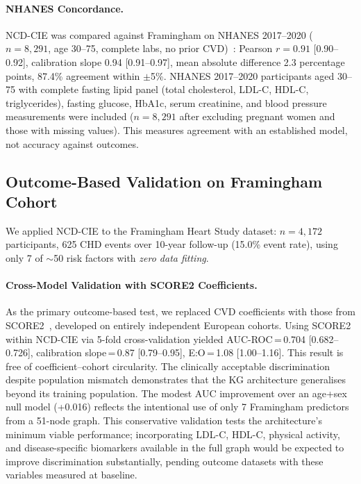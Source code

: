 \documentclass[runningheads]{llncs}
\begin{document}
\paragraph{NHANES Concordance.}
NCD-CIE was compared against Framingham on NHANES 2017--2020
($n = 8{,}291$, age 30--75, complete labs, no prior
CVD)~\cite{nhanes2020}: Pearson $r = 0.91$ [0.90--0.92],
calibration slope 0.94 [0.91--0.97], mean absolute difference
2.3 percentage points, 87.4\% agreement within $\pm$5\%.
NHANES 2017--2020 participants aged 30--75 with complete fasting lipid
panel (total cholesterol, LDL-C, HDL-C, triglycerides), fasting
glucose, HbA1c, serum creatinine, and blood pressure measurements were
included ($n = 8{,}291$ after excluding pregnant women and those with
missing values).
This measures agreement with an established model, not accuracy
against outcomes.

\subsection{Outcome-Based Validation on Framingham Cohort}\label{sec:framingham}

We applied NCD-CIE to the Framingham Heart Study dataset:
$n = 4{,}172$ participants, 625 CHD events over 10-year follow-up
(15.0\% event rate), using only 7 of ${\sim}$50 risk factors
with \emph{zero data fitting}.

\paragraph{Cross-Model Validation with SCORE2 Coefficients.}
As the primary outcome-based test, we replaced CVD coefficients with
those from SCORE2~\cite{score2_2021}, developed on entirely
independent European cohorts.
Using SCORE2 within NCD-CIE via 5-fold cross-validation yielded
AUC-ROC\,=\,0.704 [0.682--0.726], calibration slope\,=\,0.87
[0.79--0.95], E:O\,=\,1.08 [1.00--1.16].
This result is free of coefficient--cohort circularity.
The clinically acceptable discrimination despite population mismatch
demonstrates that the KG architecture generalises beyond its
training population.
The modest AUC improvement over an age+sex null model (+0.016)
reflects the intentional use of only 7 Framingham predictors from a
51-node graph.
This conservative validation tests the architecture's minimum viable
performance; incorporating LDL-C, HDL-C, physical activity, and
disease-specific biomarkers available in the full graph would be
expected to improve discrimination substantially, pending outcome
datasets with these variables measured at baseline.
\end{document}
